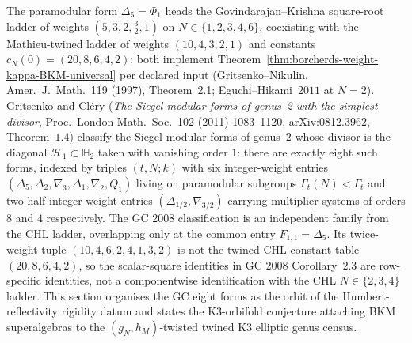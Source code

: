 The paramodular form $\Delta_5 = \Phi_1$ heads the
Govindarajan--Krishna square-root ladder of weights
$(5, 3, 2, \tfrac32, 1)$ on $N \in \{1,2,3,4,6\}$, coexisting with
the Mathieu-twined ladder of weights $(10, 4, 3, 2, 1)$ and constants
$c_N(0) = (20, 8, 6, 4, 2)$; both implement
Theorem~\ref{thm:borcherds-weight-kappa-BKM-universal} per declared
input (Gritsenko--Nikulin, Amer.~J.~Math.~119 (1997), Theorem~2.1;
Eguchi--Hikami~$2011$ at $N = 2$). Gritsenko and
Cl\'ery (\emph{The Siegel modular forms of genus~2 with the simplest
divisor}, Proc.\ London Math.\ Soc.~102 (2011) 1083--1120,
arXiv:0812.3962, Theorem~$1.4$) classify the Siegel modular forms of
genus~$2$ whose divisor is the diagonal $\mathcal{H}_1 \subset
\mathbb{H}_2$ taken with vanishing order $1$: there are exactly eight
such forms, indexed by triples $(t, N; k)$ with six integer-weight
entries $(\Delta_5, \Delta_2, \nabla_3, \Delta_1, \nabla_2, Q_1)$
living on paramodular subgroups $\Gamma_t(N) < \Gamma_t$ and two
half-integer-weight entries $(\Delta_{1/2}, \nabla_{3/2})$ carrying
multiplier systems of orders $8$ and $4$ respectively. The GC 2008
classification is an independent family from the CHL ladder, overlapping
only at the common entry $F_{1, 1} = \Delta_5$. Its twice-weight tuple
$(10,4,6,2,4,1,3,2)$ is not the twined CHL constant table
$(20,8,6,4,2)$, so the scalar-square identities in GC 2008 Corollary~$2.3$
are row-specific identities, not a componentwise identification with the
CHL $N\in\{2,3,4\}$ ladder. This section organises the GC eight forms as
the orbit of the Humbert-reflectivity rigidity datum and
states the K3-orbifold conjecture attaching BKM superalgebras to the
$(g_N, h_M)$-twisted twined K3 elliptic genus census.

